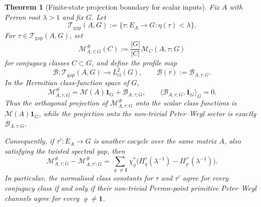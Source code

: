 \documentclass[11pt,a4paper]{amsart}
\theoremstyle{plain}
\newtheorem{theorem}{Theorem}[section]
\theoremstyle{definition}
\theoremstyle{remark}
\begin{document}
\begin{theorem}[Finite-state projection boundary for scalar inputs]
  \label{thm:scalar-normalisation-projection-boundary}
  Fix \(A\) with Perron root \(\lambda>1\) and fix \(G\). Let
  \[
    \mathcal T_{\mathrm{gap}}(A,G)
    :=
    \{\tau:E_A\to G:\eta(\tau)<\lambda\}.
  \]
  For \(\tau\in\mathcal T_{\mathrm{gap}}(A,G)\), set
  \[
    \mathcal M^\#_{A,\tau;G}(C)
    :=\frac{|G|}{|C|}\mathcal M_C(A,\tau;G)
  \]
  for conjugacy classes \(C\subset G\), and define the profile map
  \[
    \mathcal B:
    \mathcal T_{\mathrm{gap}}(A,G)\longrightarrow L^2_{\mathrm{cl}}(G),
    \qquad
    \mathcal B(\tau):=\mathcal B_{A,\tau;G}.
  \]
  In the Hermitian class-function space of \(G\),
  \begin{equation}\label{eq:scalar-normalisation-projection}
    \mathcal M^\#_{A,\tau;G}
    =
    \mathcal M(A)\mathbf 1_G+\mathcal B_{A,\tau;G},
    \qquad
    \langle \mathcal B_{A,\tau;G},\mathbf 1_G\rangle_G=0.
  \end{equation}
  Thus the orthogonal projection of
  \(\mathcal M^\#_{A,\tau;G}\) onto the scalar class functions is
  \(\mathcal M(A)\mathbf 1_G\), while the projection onto the
  non-trivial Peter--Weyl sector is exactly
  \(\mathcal B_{A,\tau;G}\).

  Consequently, if \(\tau'\!:\!E_A\to G\) is another cocycle over the
  same matrix \(A\), also satisfying the twisted spectral gap, then
  \begin{equation}\label{eq:scalar-normalisation-two-cocycles}
    \mathcal M^\#_{A,\tau;G}-\mathcal M^\#_{A,\tau';G}
    =
    \sum_{\varrho\neq\mathbf 1}
      \chi_\varrho^\ast
      \bigl(\Pi_\varrho^{\tau}(\lambda^{-1})
            -\Pi_\varrho^{\tau'}(\lambda^{-1})\bigr).
  \end{equation}
  In particular, the normalised class constants for \(\tau\) and
  \(\tau'\) agree for every conjugacy class if and only if their
  non-trivial Perron-point primitive Peter--Weyl channels agree for
  every \(\varrho\neq\mathbf 1\).


\end{theorem}
\end{document}

